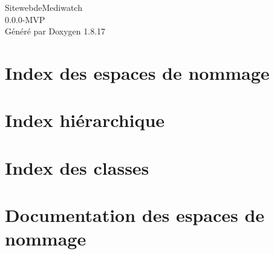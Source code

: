 \let\mypdfximage\pdfximage\def\pdfximage{\immediate\mypdfximage}\documentclass[twoside]{book}
\newcommand{\+}{\discretionary{\mbox{\scriptsize$\hookleftarrow$}}{}{}}
\newcommand{\clearemptydoublepage}{%
  \newpage{\pagestyle{empty}\cleardoublepage}%
}
\begin{document}
\hypersetup{pageanchor=false,
             bookmarksnumbered=true,
             pdfencoding=unicode
            }
\begin{titlepage}
\vspace*{7cm}
\begin{center}%
{\Large Sitewebde\+Mediwatch \\[1ex]\large 0.\+0.\+0-\/M\+VP }\\
\vspace*{1cm}
{\large Généré par Doxygen 1.8.17}\\
\end{center}
\end{titlepage}
\clearemptydoublepage
{}
\tableofcontents
\clearemptydoublepage
{}
\hypersetup{pageanchor=true}

\chapter{Index des espaces de nommage}

\chapter{Index hiérarchique}

\chapter{Index des classes}

\chapter{Documentation des espaces de nommage}


















\end{document}
